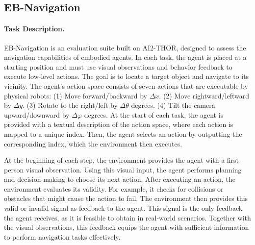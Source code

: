 \subsection{EB-Navigation}
\paragraph{Task Description.}EB-Navigation is an evaluation suite built on AI2-THOR, designed to assess the navigation capabilities of embodied agents. In each task, the agent is placed at a starting position and must use visual observations and behavior feedback to execute low-level actions. The goal is to locate a target object and navigate to its vicinity.
The agent’s action space consists of seven actions that are executable by physical robots: 
(1) Move forward/backward by $\Delta x$.  
(2) Move rightward/leftward by $\Delta y$.  
(3) Rotate to the right/left by $\Delta \theta$ degrees.  
(4) Tilt the camera upward/downward by $\Delta \varphi$ degrees.
At the start of each task, the agent is provided with a textual description of the action space, where each action is mapped to a unique index. Then, the agent selects an action by outputting the corresponding index, which the environment then executes.


At the beginning of each step, the environment provides the agent with a first-person visual observation. Using this visual input, the agent performs planning and decision-making to choose its next action. After executing an action, the environment evaluates its validity. For example, it checks for collisions or obstacles that might cause the action to fail. The environment then provides this valid or invalid signal as feedback to the agent. This signal is the only feedback the agent receives, as it is feasible to obtain in real-world scenarios. Together with the visual observations, this feedback equips the agent with sufficient information to perform navigation tasks effectively.


